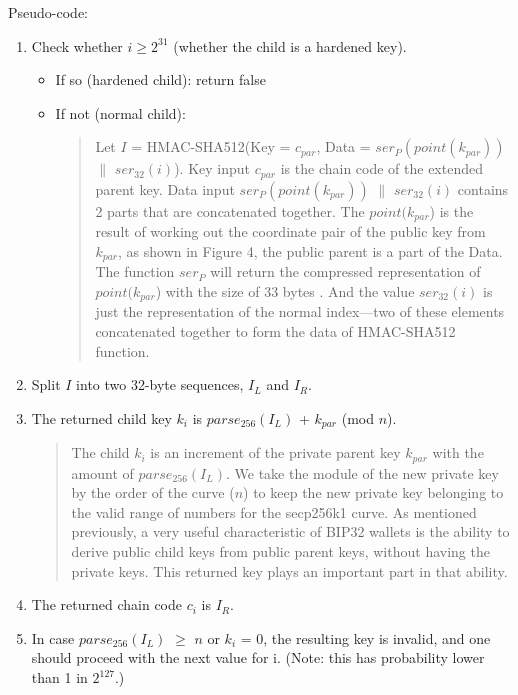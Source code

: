 Pseudo-code:
\begin{enumerate}
    \item Check whether $i \geq 2^{31}$ (whether the child is a hardened key).
          \begin{itemize}
              \item If so (hardened child): return false

              \item If not (normal child):
                    \begin{quote}

                        Let $I$ = HMAC-SHA512(Key = $c_{par}$, Data = $ser_P(point(k_{par}))$ $\parallel$ $ser_{32}(i)$).
                        Key input $c_{par}$ is the chain code of the extended parent key. Data input $ser_P(point(k_{par}))$ $\parallel$ $ser_{32}(i)$ contains 2 parts that are concatenated together. The $point(k_{par}$) is the result of working out the coordinate pair of the public key from $k_{par}$, as shown in Figure 4, the public parent is a part of the Data. The function $ser_{P}$ will return the compressed representation of $point(k_{par}$) with the size of 33 bytes \cite{secp256k1}. And the value $ser_{32}(i)$ is just the representation of the normal index—two of these elements concatenated together to form the data of HMAC-SHA512 function.
                    \end{quote}

          \end{itemize}
          \bigskip

    \item Split $I$ into two 32-byte sequences, $I_L$ and $I_R$.
          \bigskip

    \item The returned child key $k_i$ is $parse_{256}(I_L)$ + $k_{par}$ (mod $n$).

          \begin{quote}
              The child $k_i$ is an increment of the private parent key $k_{par}$ with the amount of $parse_{256}(I_L)$. We take the module of the new private key by the order of the curve ($n$) to keep the new private key belonging to the valid range of numbers for the secp256k1 curve. As mentioned previously, a very useful characteristic of BIP32 wallets is the ability to derive public child keys from public parent keys, without having the private keys. This returned key plays an important part in that ability.
          \end{quote}
          \bigskip

    \item The returned chain code $c_i$ is $I_R$.
          \bigskip

    \item In case $parse_{256}(I_L)$ $\geq$ $n$ or $k_i$ = 0, the resulting key is invalid, and one should proceed with the next value for i. (Note: this has probability lower than 1 in $2^{127}$.)

\end{enumerate}

